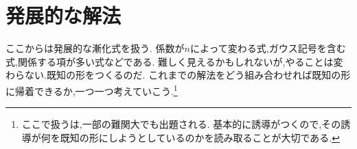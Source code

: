 ﻿%

\section{発展的な解法}\label{節：発展的な解法}
ここからは発展的な漸化式を扱う.
係数が$n$によって変わる式,ガウス記号を含む式,関係する項が多い式などである.
難しく見えるかもしれないが,やることは変わらない.既知の形をつくるのだ.
これまでの解法をどう組み合わせれば既知の形に帰着できるか,一つ一つ考えていこう.\footnote{ここで扱うは,一部の難関大でも出題される.
  基本的に誘導がつくので,その誘導が何を既知の形にしようとしているのかを読み取ることが大切である.}
